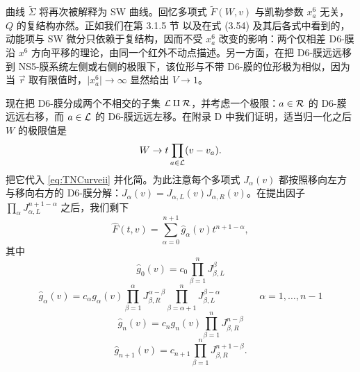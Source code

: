 曲线 $\tilde \Sigma$ 将再次被解释为 SW 曲线。回忆多项式 $\tilde F(W,v)$ 与凯勒参数 $x^6_a$ 无关，$Q$ 的复结构亦然。正如我们在第 3.1.5 节%
以及在式 (3.54)%
及其后各式中看到的，动能项与 SW 微分只依赖于复结构，因而不受 $x^6_a$ 改变的影响：两个仅相差 D6-膜沿 $x^6$ 方向平移的理论，由同一个红外不动点描述。另一方面，在把 D6-膜远远移到 NS5-膜系统左侧或右侧的极限下，该位形与不带 D6-膜的位形极为相似，因为当 $\vec r$ 取有限值时，$\vert x^6_a\vert \to \infty$ 显然给出 $V\to 1$。

现在把 D6-膜分成两个不相交的子集 $\mathcal{L} \amalg \mathcal{R}$，并考虑一个极限：$a \in \mathcal{R}$ 的 D6-膜远远右移，而 $a\in \mathcal{L}$ 的 D6-膜远远左移。在附录 D%
中我们证明，适当归一化之后 $W$ 的极限值是
\begin{equation}\label{eq:W-t-limit}
W \to t \prod_{a\in\mathcal{L}}(v-v_a).
\end{equation}
把它代入 \eqref{eq:TNCurveii} 并化简。为此注意每个多项式 $J_\alpha(v)$ 都按照移向左方与移向右方的 D6-膜分解：$J_\alpha(v) = J_{\alpha,L}(v) J_{\alpha,R}(v)$。在提出因子 $\prod_{\alpha} J_{\alpha,L}^{n+1-\alpha}$ 之后，我们剩下
\begin{equation}\label{eq:Fhatcurve}
\hat F(t,v) = \sum_{\alpha=0}^{n+1} \hat g_{\alpha}(v) t^{n+1-\alpha},
\end{equation}
其中
\begin{equation}\label{eq:hatgee}
\hat g_0(v)  =  c_0 \prod_{\beta=1}^n J_{\beta,L}^\beta
\end{equation}
\begin{equation}\label{eq:hatgee-2}
\hat g_{\alpha}(v)  =  c_{\alpha} g_{\alpha}(v) \prod_{\beta=1}^{\alpha} J_{
\beta,R}^{\alpha-\beta} \prod_{\beta=\alpha+1}^{n}
J_{\beta,L}^{\beta-\alpha}\qquad\qquad \alpha =1, \dots, n-1
\end{equation}
\begin{equation}\label{eq:hatgee-3}
\hat g_n(v)  =  c_{n} g_{n}(v) \prod_{\beta=1}^{n} J_{
\beta,R}^{n-\beta}
\end{equation}
\begin{equation}\label{eq:hatgee-4}
\hat g_{n+1}(v) =  c_{n+1} \prod_{\beta=1}^{n}
J_{\beta,R}^{n+1-\beta}.
\end{equation}

